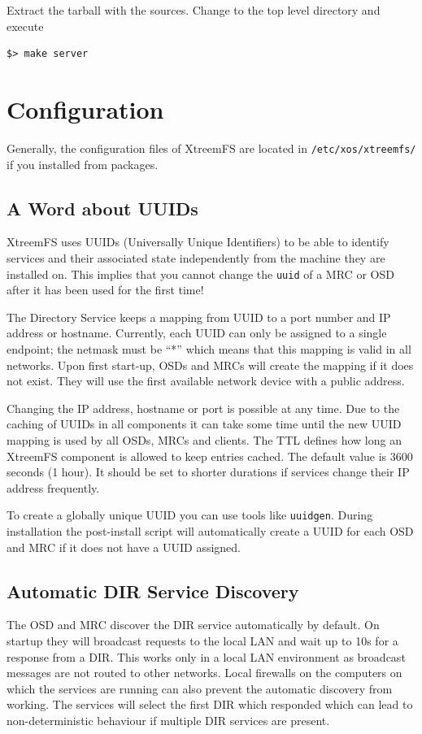 \documentclass[a4paper,10pt]{book}
\begin{document}
Extract the tarball with the sources. Change to the top level directory and execute


\begin{verbatim}
$> make server
\end{verbatim}


\section{Configuration}
\label{sec:service_config}

Generally, the configuration files of XtreemFS are located in \texttt{/etc/xos/xtreemfs/} if you installed from packages.


\subsection{A Word about UUIDs}

XtreemFS uses UUIDs (Universally Unique Identifiers) to be able to identify services and their associated state independently from the machine they are installed on. This implies that you cannot change the \texttt{uuid} of a MRC or OSD after it has been used for the first time!

The Directory Service keeps a mapping from UUID to a port number and IP address or hostname. Currently, each UUID can only be assigned to a single endpoint; the netmask must be ``*'' which means that this mapping is valid in all networks. Upon first start-up, OSDs and MRCs will create the mapping if it does not exist. They will use the first available network device with a public address.

Changing the IP address, hostname or port is possible at any time. Due to the caching of UUIDs in all components it can take some time until the new UUID mapping is used by all OSDs, MRCs and clients. The TTL defines how long an XtreemFS component is allowed to keep entries cached. The default value is 3600 seconds (1 hour). It should be set to shorter durations if services change their IP address frequently.

To create a globally unique UUID you can use tools like \texttt{uuidgen}. During installation the post-install script will automatically create a UUID for each OSD and MRC if it does not have a UUID assigned.

\subsection{Automatic DIR Service Discovery}
\label{sec:autodiscover}
The OSD and MRC discover the DIR service automatically by default. On startup they will broadcast requests to the local LAN and wait up to 10s for a response from a DIR. This works only in a local LAN environment as broadcast messages are not routed to other networks. Local firewalls on the computers on which the services are running can also prevent the automatic discovery from working. The services will select the first DIR which responded which can lead to non-deterministic behaviour if multiple DIR services are present.
\end{document}
